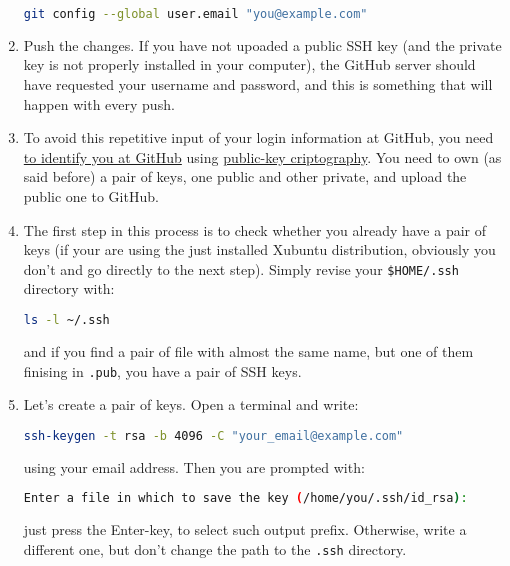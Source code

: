 \begin{enumerate}
  \begin{lstlisting}[language=bash]
    git config --global user.email "you@example.com"
  \end{lstlisting}

\item Push the changes. If you have not upoaded a public
  SSH key (and the private key is not properly installed in your
  computer), the GitHub server should have requested your username and
  password, and this is something that will happen with every push.
\item To avoid this repetitive input of your login information at
  GitHub, you need
  \href{https://docs.github.com/en/github/authenticating-to-github/connecting-to-github-with-ssh}{to
    identify you at GitHub} using
  \href{https://en.wikipedia.org/wiki/Public-key_cryptography}{public-key
    criptography}. You need to own (as said before) a pair of keys,
  one public and other private, and upload the public one to GitHub.
  
\item The first step in this process is to check whether you already
  have a pair of keys (if your are using the just installed Xubuntu
  distribution, obviously you don't and go directly to the next
  step). Simply revise your \texttt{\$HOME/.ssh} directory with:

  \begin{lstlisting}[language=bash]
    ls -l ~/.ssh
  \end{lstlisting}

  and if you find a pair of file with almost the same name, but one of
  them finising in \texttt{.pub}, you have a pair of SSH keys.

\item Let's create a pair of keys. Open a terminal and write:

  \begin{lstlisting}[language=bash]
    ssh-keygen -t rsa -b 4096 -C "your_email@example.com"
  \end{lstlisting}

  using your email address. Then you are prompted with:

  \begin{lstlisting}[language=bash]
    Enter a file in which to save the key (/home/you/.ssh/id_rsa):
  \end{lstlisting}

  just press the Enter-key, to select such output prefix. Otherwise,
  write a different one, but don't change the path to the
  \texttt{.ssh} directory.


\end{enumerate}
